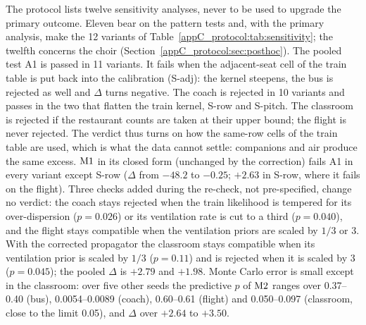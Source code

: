 The protocol lists twelve sensitivity analyses, never to be used to upgrade the primary outcome. Eleven bear
on the pattern tests and, with the primary analysis, make the 12 variants of
Table~\ref{appC_protocol:tab:sensitivity}; the twelfth concerns the choir
(Section~\ref{appC_protocol:sec:posthoc}). The pooled test A1 is passed in 11 variants. It fails when the
adjacent-seat cell of the train table is put back into the calibration (S-adj): the kernel steepens, the bus
is rejected as well and $\Delta$ turns negative. The coach is rejected in 10 variants and passes in the two
that flatten the train kernel, S-row and S-pitch. The classroom is rejected if the restaurant counts are taken
at their upper bound; the flight is never rejected. The verdict thus turns on how the same-row cells of the
train table are used, which is what the data cannot settle: companions and air produce the same excess.
$\mathrm{M1}$ in its closed form (unchanged by the correction) fails A1 in every variant except S-row ($\Delta$ from $-48.2$ to $-0.25$; $+2.63$
in S-row, where it fails on the flight).
Three checks added during the re-check, not pre-specified, change no verdict: the coach stays rejected when
the train likelihood is tempered for its over-dispersion ($p=0.026$) or its ventilation rate is cut to a third
($p=0.040$), and the flight stays compatible when the ventilation priors are scaled by $1/3$ or 3. With the
corrected propagator the classroom stays compatible when its ventilation prior is scaled by $1/3$
($p=0.11$) and is rejected when it is scaled by 3 ($p=0.045$); the pooled $\Delta$ is $+2.79$ and $+1.98$.
Monte Carlo error is small except in the classroom: over five other seeds the predictive $p$ of $\mathrm{M2}$ ranges
over 0.37--0.40 (bus), 0.0054--0.0089 (coach), 0.60--0.61 (flight) and 0.050--0.097 (classroom, close to the
limit 0.05), and $\Delta$ over $+2.64$ to $+3.50$.

